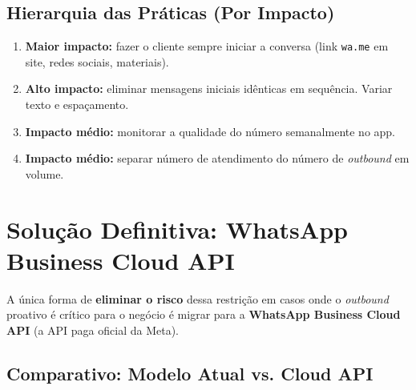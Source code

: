 \documentclass[12pt, a4paper]{article}
\begin{document}
\subsection{Hierarquia das Práticas (Por Impacto)}

\begin{enumerate}
    \item \textcolor{successGreen}{\textbf{Maior impacto:}} fazer o cliente sempre iniciar a conversa (link \texttt{wa.me} em site, redes sociais, materiais).
    \item \textcolor{successGreen}{\textbf{Alto impacto:}} eliminar mensagens iniciais idênticas em sequência. Variar texto e espaçamento.
    \item \textcolor{warningOrange}{\textbf{Impacto médio:}} monitorar a qualidade do número semanalmente no app.
    \item \textcolor{warningOrange}{\textbf{Impacto médio:}} separar número de atendimento do número de \textit{outbound} em volume.
\end{enumerate}

\needspace{10cm}

\section{Solução Definitiva: WhatsApp Business Cloud API}

A única forma de \textbf{eliminar o risco} dessa restrição em casos onde o \textit{outbound} proativo é crítico para o negócio é migrar para a \textbf{WhatsApp Business Cloud API} (a API paga oficial da Meta).

\subsection{Comparativo: Modelo Atual vs. Cloud API}
\end{document}
